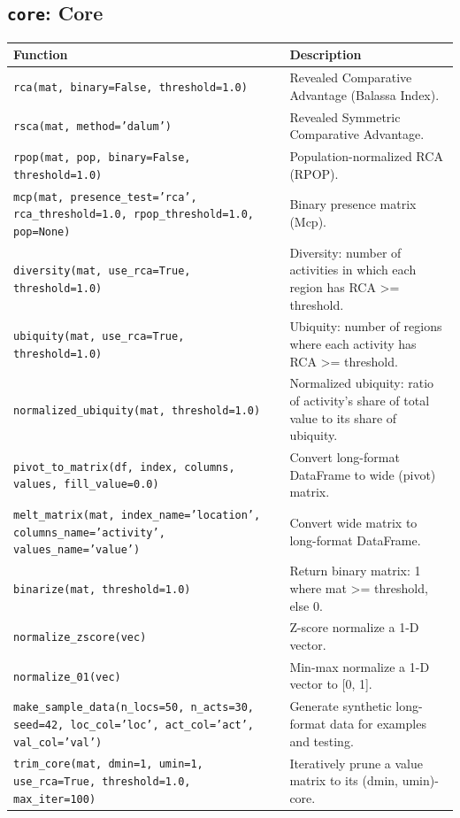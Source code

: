 \subsection{\texttt{core}: Core}
\begin{longtable}{>{\raggedright\arraybackslash}p{9.2cm} >{\raggedright\arraybackslash}p{7.0cm}}
\toprule
\textbf{Function} & \textbf{Description} \\
\midrule\endhead
\texttt{\footnotesize rca(mat, binary=False, threshold=1.0)} & {\small Revealed Comparative Advantage (Balassa Index).} \\[2pt]
\texttt{\footnotesize rsca(mat, method='dalum')} & {\small Revealed Symmetric Comparative Advantage.} \\[2pt]
\texttt{\footnotesize rpop(mat, pop, binary=False, threshold=1.0)} & {\small Population-normalized RCA (RPOP).} \\[2pt]
\texttt{\footnotesize mcp(mat, presence\_test='rca', rca\_threshold=1.0, rpop\_threshold=1.0, pop=None)} & {\small Binary presence matrix (Mcp).} \\[2pt]
\texttt{\footnotesize diversity(mat, use\_rca=True, threshold=1.0)} & {\small Diversity: number of activities in which each region has RCA >= threshold.} \\[2pt]
\texttt{\footnotesize ubiquity(mat, use\_rca=True, threshold=1.0)} & {\small Ubiquity: number of regions where each activity has RCA >= threshold.} \\[2pt]
\texttt{\footnotesize normalized\_ubiquity(mat, threshold=1.0)} & {\small Normalized ubiquity: ratio of activity's share of total value to its share of ubiquity.} \\[2pt]
\texttt{\footnotesize pivot\_to\_matrix(df, index, columns, values, fill\_value=0.0)} & {\small Convert long-format DataFrame to wide (pivot) matrix.} \\[2pt]
\texttt{\footnotesize melt\_matrix(mat, index\_name='location', columns\_name='activity', values\_name='value')} & {\small Convert wide matrix to long-format DataFrame.} \\[2pt]
\texttt{\footnotesize binarize(mat, threshold=1.0)} & {\small Return binary matrix: 1 where mat >= threshold, else 0.} \\[2pt]
\texttt{\footnotesize normalize\_zscore(vec)} & {\small Z-score normalize a 1-D vector.} \\[2pt]
\texttt{\footnotesize normalize\_01(vec)} & {\small Min-max normalize a 1-D vector to [0, 1].} \\[2pt]
\texttt{\footnotesize make\_sample\_data(n\_locs=50, n\_acts=30, seed=42, loc\_col='loc', act\_col='act', val\_col='val')} & {\small Generate synthetic long-format data for examples and testing.} \\[2pt]
\texttt{\footnotesize trim\_core(mat, dmin=1, umin=1, use\_rca=True, threshold=1.0, max\_iter=100)} & {\small Iteratively prune a value matrix to its (dmin, umin)-core.} \\[2pt]
\bottomrule
\end{longtable}

